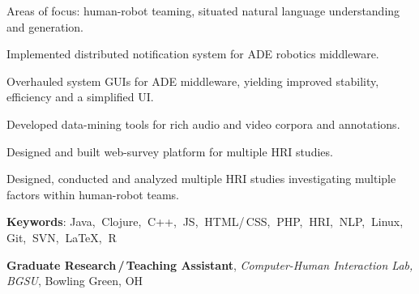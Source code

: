 \documentclass[10pt, letter]{article}
\newcommand{\years}[1]{\marginnote{\footnotesize #1}}
\newenvironment{desc*}{
  \begin{description}
    \setlength{\itemsep}{0.2pt}
    \setlength{\parskip}{-1pt}
    \setlength{\parsep}{0pt}
  }{
  \end{description}
}
\begin{document}
Areas of focus: human-robot teaming, situated natural language understanding and generation. 
\begin{itemize}[leftmargin=*, parsep=0pt, rightmargin=1.5cm]
  {\light
\item Implemented distributed notification system for ADE robotics
  middleware. 
\item Overhauled system GUIs for ADE middleware, yielding improved
  stability, efficiency and a simplified UI. 
\item Developed data-mining tools for rich audio and video corpora and annotations. 
\item Designed and built web-survey platform for multiple HRI studies. 
\item Designed, conducted and analyzed multiple HRI studies
  investigating multiple factors within human-robot teams.
  }
\end{itemize}
\begin{desc*}
\item[\rm \color{redblue} \textbf{Keywords}:] Java,$\:$ Clojure,$\:$ C++,$\:$
  JS,$\:$ HTML/\,CSS,$\:$ PHP,$\:$ HRI,$\:$ NLP,$\:$ Linux,$\:$ Git,$\:$ SVN,$\:$ \LaTeX,$\:$ R\bigbreak
\end{desc*}

\years{2010 - 2012}
\textbf{\fontsize{10.5pt}{1em}\selectfont Graduate Research\,/\,Teaching Assistant}, 
\textit{Computer-Human Interaction Lab, BGSU}, Bowling Green, OH \bigskip
\end{document}
